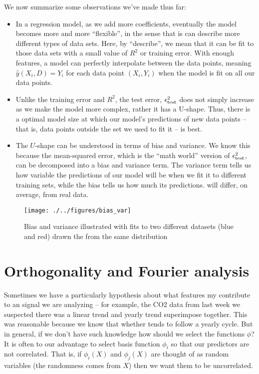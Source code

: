  We now summarize some observations we've made thus far:
\begin{itemize}
\item In a regression model, as we add more coefficients, eventually the model becomes more and more ``flexible'', in the sense that is can describe more different types of data sets. Here, by ``describe'', we mean that it can be fit to those data sets with a small value of $R^2$ or training error.  With enough features, a model can perfectly interpolate between the data points, meaning $\hat{y}(X_i,D) = Y_i$ for each data point $(X_i,Y_i)$ when the model is fit on all our data points. 
\item Unlike the training error and $R^2$, the test error, $\epsilon_{\rm test}^2$ does not simply increase as we make the model more complex, rather it has a U-shape. Thus, there is a optimal model size at which our model's predictions of new data points -- that is, data points outside the set we used to fit it -- is best. 
\item The $U$-shape can be understood in terms of bias and variance. We know this because the mean-squared error, which is the ``math world'' version of $\epsilon_{\rm test}^2$, can be decomposed into a bias and variance term. The variance term tells us how variable the predictions of our model will be when we fit it to different training sets, while the bias tells us how much its predictions. will differ, on average, from real data. 
\end{itemize}

\begin{figure}[h]
    \centering
    \texttt{[image: ./../figures/bias\_var]}
    \caption{Bias and variance illustrated with fits to two different datasets (blue and red) drawn the from the same distribution}
    \label{fig:bv}
\end{figure}







\section{Orthogonality and Fourier analysis}
 Sometimes we have a particularly hypothesis about what features my contribute to an signal we are analyzing -- for example, the CO2 data from last week we suspected there was a linear trend and yearly trend superimpose together. This was reasonable because we know that whether tends to follow a yearly cycle. But in general, if we don't have such knowledge how should we select the functions $\phi$?  It is often to our advantage to select basis function $\phi_i$ so that our predictors are not correlated. That is, if $\phi_i(X)$ and $\phi_j(X)$ are thought of as random variables (the randomness comes from $X$) then we want them to be uncorrelated. 


